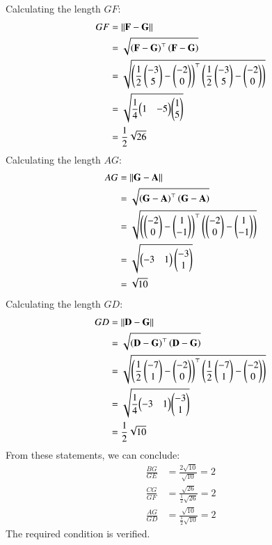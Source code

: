 \documentclass[journal,12pt,twocolumn]{IEEEtran}
\theoremstyle{remark}
\begin{document}
Calculating the length $GF$:
\begin{align}
GF &= \left\lVert\mathbf{F} - \mathbf{G}\right\rVert\\
&= \sqrt{\left(\mathbf{F}-\mathbf{G}\right)^{\top}\left(\mathbf{F}-\mathbf{G}\right)} \\
&= \sqrt{\left(\frac{1}{2}\begin{pmatrix}-3\\5\end{pmatrix} - \begin{pmatrix}-2\\0\end{pmatrix}\right)^{\top}\left(\frac{1}{2}\begin{pmatrix}-3\\5\end{pmatrix} - \begin{pmatrix}-2\\0\end{pmatrix}\right)}\\
&= \sqrt{\frac{1}{4}{\begin{pmatrix}1&-5\end{pmatrix}}{\begin{pmatrix}1\\5\end{pmatrix}}}\\
&= \frac{1}{2}\sqrt{26}
\end{align}
Calculating the length $AG$:
\begin{align}
AG &= \left\lVert\mathbf{G} - \mathbf{A}\right\rVert\\
&= \sqrt{\left(\mathbf{G}-\mathbf{A}\right)^{\top}\left(\mathbf{G}-\mathbf{A}\right)} \\
&= \sqrt{\left(\begin{pmatrix}-2\\0\end{pmatrix} - \begin{pmatrix}1\\-1\end{pmatrix}\right)^{\top}\left(\begin{pmatrix}-2\\0\end{pmatrix} - \begin{pmatrix}1\\-1\end{pmatrix}\right)}\\
&= \sqrt{{\begin{pmatrix}-3&1\end{pmatrix}}\begin{pmatrix}-3\\1\end{pmatrix}}\\
&= \sqrt{10}
\end{align}
Calculating the length $GD$:
\begin{align}
GD &= \left\lVert\mathbf{D} - \mathbf{G}\right\rVert\\
&= \sqrt{\left(\mathbf{D}-\mathbf{G}\right)^{\top}\left(\mathbf{D}-\mathbf{G}\right)} \\
&= \sqrt{\left(\frac{1}{2}\begin{pmatrix}-7\\1\end{pmatrix} - \begin{pmatrix}-2\\0\end{pmatrix}\right)^{\top}\left(\frac{1}{2}\begin{pmatrix}-7\\1\end{pmatrix} - \begin{pmatrix}-2\\0\end{pmatrix}\right)}\\
&= \sqrt{\frac{1}{4}{\begin{pmatrix}-3&1\end{pmatrix}}{\begin{pmatrix}-3\\1\end{pmatrix}}}\\
&= \frac{1}{2}\sqrt{10}
\end{align}
From these statements, we can conclude: 
\begin{align}
\frac{BG}{GE} &= \frac{2\sqrt{10}}{\sqrt{10}} = 2\\
\frac{CG}{GF} &= \frac{\sqrt{26}}{\frac{1}{2}\sqrt{26}} = 2\\
\frac{AG}{GD} &= \frac{\sqrt{10}}{\frac{1}{2}\sqrt{10}} = 2
\end{align}
The required condition is verified.
\end{document}
